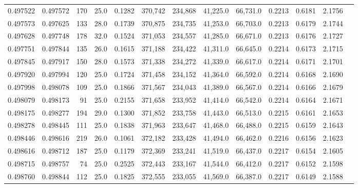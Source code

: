 \begin{tabular}{rrrrrrrrrrrrr}
0.497522 & 0.497572 &   170 & 25.0 &                                     0.1282 & 370,742 & 234,868 &  41,225.0 &  66,731.0 & 0.2213 & 0.6181 & 2.1756 \\
0.497573 & 0.497625 &   133 & 28.0 &                                     0.1739 & 370,875 & 234,735 &  41,253.0 &  66,703.0 & 0.2213 & 0.6179 & 2.1744 \\
0.497628 & 0.497748 &   178 & 32.0 &                                     0.1524 & 371,053 & 234,557 &  41,285.0 &  66,671.0 & 0.2213 & 0.6176 & 2.1727 \\
0.497751 & 0.497844 &   135 & 26.0 &                                     0.1615 & 371,188 & 234,422 &  41,311.0 &  66,645.0 & 0.2214 & 0.6173 & 2.1715 \\
0.497845 & 0.497917 &   150 & 28.0 &                                     0.1573 & 371,338 & 234,272 &  41,339.0 &  66,617.0 & 0.2214 & 0.6171 & 2.1701 \\
0.497920 & 0.497994 &   120 & 25.0 &                                     0.1724 & 371,458 & 234,152 &  41,364.0 &  66,592.0 & 0.2214 & 0.6168 & 2.1690 \\
0.497998 & 0.498078 &   109 & 25.0 &                                     0.1866 & 371,567 & 234,043 &  41,389.0 &  66,567.0 & 0.2214 & 0.6166 & 2.1679 \\
0.498079 & 0.498173 &    91 & 25.0 &                                     0.2155 & 371,658 & 233,952 &  41,414.0 &  66,542.0 & 0.2214 & 0.6164 & 2.1671 \\
0.498175 & 0.498277 &   194 & 29.0 &                                     0.1300 & 371,852 & 233,758 &  41,443.0 &  66,513.0 & 0.2215 & 0.6161 & 2.1653 \\
0.498278 & 0.498445 &   111 & 25.0 &                                     0.1838 & 371,963 & 233,647 &  41,468.0 &  66,488.0 & 0.2215 & 0.6159 & 2.1643 \\
0.498446 & 0.498616 &   219 & 26.0 &                                     0.1061 & 372,182 & 233,428 &  41,494.0 &  66,462.0 & 0.2216 & 0.6156 & 2.1623 \\
0.498616 & 0.498712 &   187 & 25.0 &                                     0.1179 & 372,369 & 233,241 &  41,519.0 &  66,437.0 & 0.2217 & 0.6154 & 2.1605 \\
0.498715 & 0.498757 &    74 & 25.0 &                                     0.2525 & 372,443 & 233,167 &  41,544.0 &  66,412.0 & 0.2217 & 0.6152 & 2.1598 \\
0.498760 & 0.498844 &   112 & 25.0 &                                     0.1825 & 372,555 & 233,055 &  41,569.0 &  66,387.0 & 0.2217 & 0.6149 & 2.1588 \\

\end{tabular}
